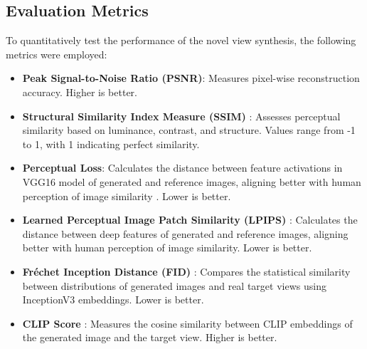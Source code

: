\subsection{Evaluation Metrics}\label{ssec:exp_metrics}
To quantitatively test the performance of the novel view synthesis, the following metrics were employed:
\begin{itemize}
  \item \textbf{Peak Signal-to-Noise Ratio (PSNR)}: Measures pixel-wise reconstruction accuracy. Higher is better.
  \item \textbf{Structural Similarity Index Measure (SSIM)} \cite{ssim}: Assesses perceptual similarity based on luminance, contrast, and structure. Values range from -1 to 1, with 1 indicating perfect similarity.
  \item \textbf{Perceptual Loss}: Calculates the distance between feature activations in VGG16 model of generated and reference images, aligning better with human perception of image similarity \cite{perceptual_loss}. Lower is better.
  \item \textbf{Learned Perceptual Image Patch Similarity (LPIPS)} \cite{lpips}: Calculates the distance between deep features of generated and reference images, aligning better with human perception of image similarity. Lower is better.
  \item \textbf{Fréchet Inception Distance (FID)} \cite{fid1, fid2}: Compares the statistical similarity between distributions of generated images and real target views using InceptionV3 embeddings. Lower is better.
  \item \textbf{CLIP Score} \cite{clipscore}: Measures the cosine similarity between CLIP embeddings of the generated image and the target view. Higher is better.
\end{itemize}

